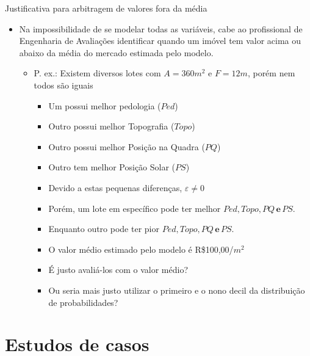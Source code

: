 \documentclass[9pt,ignorenonframetext,aspectratio=169]{beamer}
\providecommand{\tightlist}{%
  \setlength{\itemsep}{0pt}\setlength{\parskip}{0pt}}
\begin{document}
\begin{frame}{Justificativa para arbitragem de valores fora da média}
\protect\hypertarget{justificativa-para-arbitragem-de-valores-fora-da-muxe9dia}{}

\begin{itemize}[<+->]
\tightlist
\item
  Na impossibilidade de se modelar todas as variáveis, cabe ao
  profissional de Engenharia de Avaliações identificar quando um imóvel
  tem valor acima ou abaixo da média do mercado estimada pelo modelo.

  \begin{itemize}[<+->]
  \tightlist
  \item
    P. ex.: Existem diversos lotes com \(A = 360m^2\) e \(F = 12m\),
    porém nem todos são iguais

    \begin{itemize}[<+->]
    \tightlist
    \item
      Um possui melhor pedologia (\(Ped\))
    \item
      Outro possui melhor Topografia (\(Topo\))
    \item
      Outro possui melhor Posição na Quadra (\(PQ\))
    \item
      Outro tem melhor Posição Solar (\(PS\))
    \item
      Devido a estas pequenas diferenças, \(\varepsilon \ne 0\)
    \item
      Porém, um lote em específico pode ter melhor
      \(Ped, Topo, PQ \,\textbf{e}\, PS\).
    \item
      Enquanto outro pode ter pior \(Ped, Topo, PQ \,\textbf{e}\, PS\).
    \item
      O valor médio estimado pelo modelo é R\$100,00/\(m^2\)
    \item
      É justo avaliá-los com o valor médio?
    \item
      Ou seria mais justo utilizar o primeiro e o nono decil da
      distribuição de probabilidades?
    \end{itemize}
  \end{itemize}
\end{itemize}

\end{frame}

\hypertarget{estudos-de-casos}{%
\section{Estudos de casos}\label{estudos-de-casos}}
\end{document}
